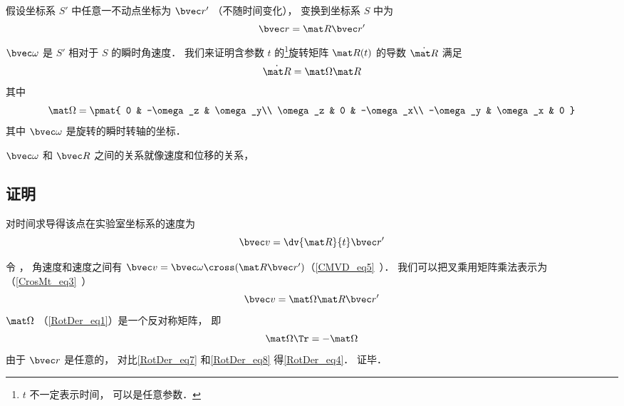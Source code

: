 

假设坐标系 $S'$ 中任意一不动点坐标为 $\bvec r'$ （不随时间变化）， 变换到坐标系 $S$ 中为
\begin{equation}
\bvec r = \mat R \bvec r'
\end{equation}
$\bvec\omega$ 是 $S'$ 相对于 $S$ 的瞬时角速度． 我们来证明含参数 $t$ 的\footnote{$t$ 不一定表示时间， 可以是任意参数．}旋转矩阵 $\mat R(t)$ 的导数 $\dot{\mat R}$ 满足
\begin{equation}\label{RotDer_eq4}
\dot{\mat R} = \mat \Omega \mat R
\end{equation}
其中
\begin{equation}\label{RotDer_eq1}
\mat \Omega = \pmat{
0 & -\omega_z & \omega_y\\
\omega_z & 0 & -\omega_x\\
-\omega_y & \omega_x & 0
}
\end{equation}
其中 $\bvec\omega$ 是旋转的瞬时转轴的坐标．

$\bvec \omega$ 和 $\bvec R$ 之间的关系就像速度和位移的关系， 

\subsection{证明}
对时间求导得该点在实验室坐标系的速度为
\begin{equation}\label{RotDer_eq7}
\bvec v = \dv{\mat R}{t} \bvec r'
\end{equation}

令 ， 角速度和速度之间有 $\bvec v = \bvec \omega \cross (\mat R \bvec r')$（\autoref{CMVD_eq5}~）． 我们可以把叉乘用矩阵乘法表示为（\autoref{CrosMt_eq3}~）
\begin{equation}\label{RotDer_eq8}
\bvec v = \mat\Omega \mat R \bvec r'
\end{equation}
$\mat\Omega$ （\autoref{RotDer_eq1}）是一个反对称矩阵， 即
\begin{equation}
\mat \Omega\Tr = -\mat \Omega
\end{equation}
由于 $\bvec r$ 是任意的， 对比\autoref{RotDer_eq7} 和\autoref{RotDer_eq8} 得\autoref{RotDer_eq4}． 证毕．

